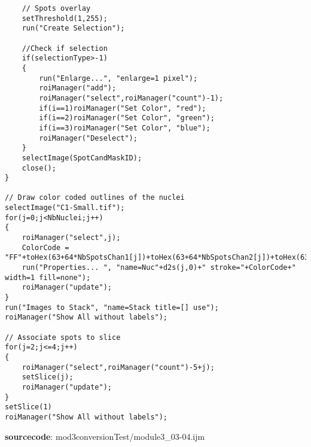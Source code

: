 \begin{itemize}
\begin{lstlisting}
	// Spots overlay
	setThreshold(1,255);
	run("Create Selection");
	
	//Check if selection
	if(selectionType>-1)
	{
		run("Enlarge...", "enlarge=1 pixel");
		roiManager("add");
		roiManager("select",roiManager("count")-1);
		if(i==1)roiManager("Set Color", "red");
		if(i==2)roiManager("Set Color", "green");
		if(i==3)roiManager("Set Color", "blue");
		roiManager("Deselect");
	}
	selectImage(SpotCandMaskID);
	close();
}
	
// Draw color coded outlines of the nuclei
selectImage("C1-Small.tif");
for(j=0;j<NbNuclei;j++)
{
	roiManager("select",j);
	ColorCode = "FF"+toHex(63+64*NbSpotsChan1[j])+toHex(63+64*NbSpotsChan2[j])+toHex(63+64*NbSpotsChan3[j]);
	run("Properties... ", "name=Nuc"+d2s(j,0)+" stroke="+ColorCode+" width=1 fill=none");
	roiManager("update");
}
run("Images to Stack", "name=Stack title=[] use");
roiManager("Show All without labels");

// Associate spots to slice
for(j=2;j<=4;j++)
{
	roiManager("select",roiManager("count")-5+j);
	setSlice(j);
	roiManager("update");
}
setSlice(1)
roiManager("Show All without labels");
\end{lstlisting}
\textbf{sourcecode}: mod3conversionTest/module3_03-04.ijm
\end{itemize}

